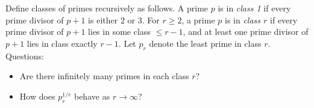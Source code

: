 Define classes of primes recursively as follows.
A prime $p$ is in \emph{class 1} if every prime divisor of $p+1$ is either $2$ or $3$.
For $r\ge 2$, a prime $p$ is in \emph{class $r$} if every prime divisor of $p+1$ lies in some class $\le r-1$, and at least one prime divisor of $p+1$ lies in class exactly $r-1$.
Let $p_r$ denote the least prime in class $r$.
Questions:
\begin{itemize}
\item Are there infinitely many primes in each class $r$?
\item How does $p_r^{1/r}$ behave as $r\to\infty$?
\end{itemize}

